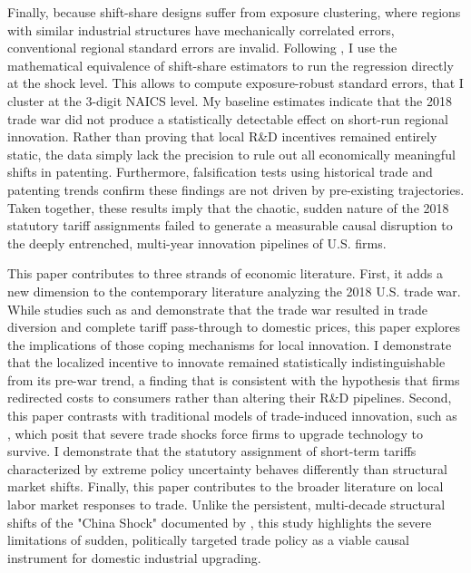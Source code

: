 Finally, because shift-share designs suffer from exposure clustering, where regions with similar industrial structures have mechanically correlated errors, conventional regional standard errors are invalid. Following \cite{BHJ2022}, I use the mathematical equivalence of shift-share estimators to run the regression directly at the shock level. This allows to compute exposure-robust standard errors, that I cluster at the 3-digit NAICS level. 
My baseline estimates indicate that the 2018 trade war did not produce a statistically detectable effect on short-run regional innovation. Rather than proving that local R\&D incentives remained entirely static, the data simply lack the precision to rule out all economically meaningful shifts in patenting. Furthermore, falsification tests using historical trade and patenting trends confirm these findings are not driven by pre-existing trajectories. Taken together, these results imply that the chaotic, sudden nature of the 2018 statutory tariff assignments failed to generate a measurable causal disruption to the deeply entrenched, multi-year innovation pipelines of U.S. firms.

This paper contributes to three strands of economic literature. First, it adds a new dimension to the contemporary literature analyzing the 2018 U.S. trade war. While studies such as \cite{Amiti2019} and \cite{Fajgelbaum2020} demonstrate that the trade war resulted in trade diversion and complete tariff pass-through to domestic prices, this paper explores the implications of those coping mechanisms for local innovation. I demonstrate that the localized incentive to innovate remained statistically indistinguishable from its pre-war trend, a finding that is consistent with the hypothesis that firms redirected costs to consumers rather than altering their R\&D pipelines. Second, this paper contrasts with traditional models of trade-induced innovation, such as \cite{Bloom2011}, which posit that severe trade shocks force firms to upgrade technology to survive. I demonstrate that the statutory assignment of short-term tariffs characterized by extreme policy uncertainty behaves differently than structural market shifts. Finally, this paper contributes to the broader literature on local labor market responses to trade. Unlike the persistent, multi-decade structural shifts of the "China Shock" documented by \cite{ADH2013}, this study highlights the severe limitations of sudden, politically targeted trade policy as a viable causal instrument for domestic industrial upgrading.


